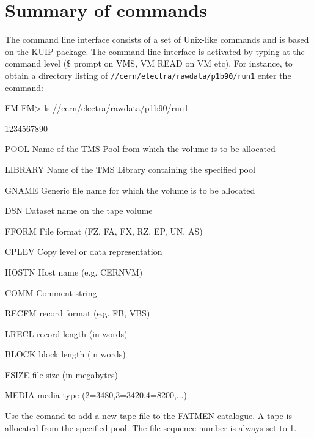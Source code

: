 \section{Summary of commands}
\par
{}
The command line interface consists of a set of Unix-like commands
and is based on the KUIP package\cite{bib-KUIP}.
The command line interface is activated by typing  at the command
level (\$ prompt on VMS, VM READ on VM etc). For instance, to obtain
a directory listing of {\tt //cern/electra/rawdata/p1b90/run1}
enter the command:
\begin{XMP}
FM
FM> \underline{ls //cern/electra/rawdata/p1b90/run1}
\end{XMP}
\begin{DLtt}{1234567890}
\item[POOL]Name of the TMS Pool from which the volume is to be allocated
\item[LIBRARY]Name of the TMS Library containing the specified pool
\item[GNAME]Generic file name for which the volume is to be allocated
\item[DSN]Dataset name on the tape volume
\item[FFORM]File format (FZ, FA, FX, RZ, EP, UN, AS)
\item[CPLEV]Copy level or data representation
\item[HOSTN]Host name (e.g. CERNVM)
\item[COMM]Comment string 
\item[RECFM]record format (e.g. FB, VBS)
\item[LRECL]record length (in words)
\item[BLOCK]block length (in words)
\item[FSIZE]file size (in megabytes)
\item[MEDIA]media type (2=3480,3=3420,4=8200,...)
\end{DLtt}
Use the  comand to add a new tape file to the FATMEN catalogue.
A tape is allocated from the specified pool. The file sequence number
is always set to 1.
